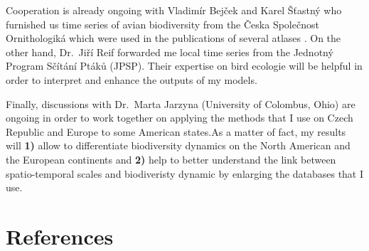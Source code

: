 \documentclass[
  12pt,
  oneside]{report}
\begin{document}
Cooperation is already ongoing with Vladimír Bejček and Karel Šťastný who furnished us time series of avian biodiversity from the Česka Společnost Ornithologiká which were used in the publications of several atlases \autocite[see][]{bejcek_velke_2016}. On the other hand, Dr.~Jiří Reif forwarded me local time series from the Jednotný Program Sčítání Ptáků (JPSP). Their expertise on bird ecologie will be helpful in order to interpret and enhance the outputs of my models.

Finally, discussions with Dr.~Marta Jarzyna (University of Colombus, Ohio) are ongoing in order to work together on applying the methods that I use on Czech Republic and Europe to some American states.As a matter of fact, my results will \textbf{1)} allow to differentiate biodiversity dynamics on the North American and the European continents and \textbf{2)} help to better understand the link between spatio-temporal scales and biodiveristy dynamic by enlarging the databases that I use.


\singlespacing %
\chapter{References}\label{references}
{
\renewcommand{\clearpage}{}
\printbibliography[heading=none] %
}
\end{document}
